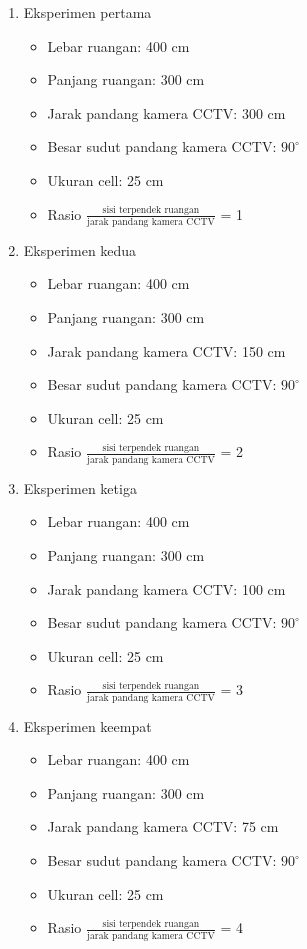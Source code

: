 \begin{enumerate}
	\item Eksperimen pertama
	\begin{itemize}
		\item Lebar ruangan: 400 cm
		\item Panjang ruangan: 300 cm
		\item Jarak pandang kamera CCTV: 300 cm
		\item Besar sudut pandang kamera CCTV: \(90^\circ\)
		\item Ukuran cell: 25 cm
		\item Rasio \(\frac{\text{sisi terpendek ruangan}}{\text{jarak pandang kamera CCTV}}\) = 1
	\end{itemize}
	
	\item Eksperimen kedua
	\begin{itemize}
		\item Lebar ruangan: 400 cm
		\item Panjang ruangan: 300 cm
		\item Jarak pandang kamera CCTV: 150 cm
		\item Besar sudut pandang kamera CCTV: \(90^\circ\)
		\item Ukuran cell: 25 cm
		\item Rasio \(\frac{\text{sisi terpendek ruangan}}{\text{jarak pandang kamera CCTV}}\) = 2
	\end{itemize}
	
	\item Eksperimen ketiga
	\begin{itemize}
		\item Lebar ruangan: 400 cm
		\item Panjang ruangan: 300 cm
		\item Jarak pandang kamera CCTV: 100 cm
		\item Besar sudut pandang kamera CCTV: \(90^\circ\)
		\item Ukuran cell: 25 cm
		\item Rasio \(\frac{\text{sisi terpendek ruangan}}{\text{jarak pandang kamera CCTV}}\) = 3
	\end{itemize}
	
	\item Eksperimen keempat
	\begin{itemize}
		\item Lebar ruangan: 400 cm
		\item Panjang ruangan: 300 cm
		\item Jarak pandang kamera CCTV: 75 cm
		\item Besar sudut pandang kamera CCTV: \(90^\circ\)
		\item Ukuran cell: 25 cm
		\item Rasio \(\frac{\text{sisi terpendek ruangan}}{\text{jarak pandang kamera CCTV}}\) = 4
	\end{itemize}
\end{enumerate}


